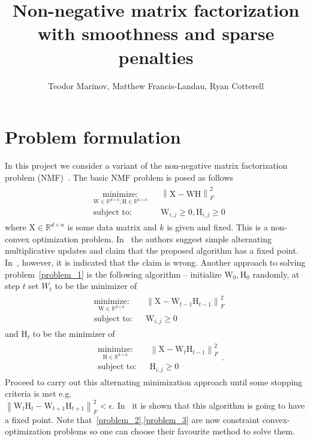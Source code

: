 \documentclass{article}
\newcommand{\0}{\mathrm{0}}
\newcommand{\1}{\mathrm{1}}
\renewcommand{\H}{\mathrm{H}}
\newcommand{\W}{\mathrm{W}}
\newcommand{\X}{\mathrm{X}}
\newcommand{\norm}[1]{\left\| #1 \right\|}
\newcommand{\minimize}[3]{
\begin{aligned}
& \underset{#1}{\textrm{minimize:}}
& & #2 \\
& \textrm{subject to:}
& &  #3
\end{aligned}
}
\begin{document}
\title{Non-negative matrix factorization with smoothness and sparse penalties}
\author{Teodor Marinov, Matthew Francis-Landau, Ryan Cotterell}
\date{}

\maketitle
\section{Problem formulation}
In this project we consider a variant of the non-negative matrix factorization problem (NMF)~\cite{lee2001algorithms}. The basic NMF problem is posed as follows
\begin{equation}\label{problem_1}
  \begin{aligned}
    \minimize{\W\in \mathbb{R}^{d\times k},\H \in \mathbb{R}^{k\times n}}{\norm{\X - \W\H}_F^2}{\W_{i,j} \geq 0,\H_{i,j}\geq 0}
  \end{aligned}
\end{equation}
where $\X\in\mathbb{R}^{d\times n}$ is some data matrix and $k$ is given and fixed. This is a non-convex optimization problem. In~\cite{lee2001algorithms} the authors suggest simple alternating multiplicative updates and claim that the proposed algorithm has a fixed point. In~\cite{gonzalez2005accelerating}, however, it is indicated that the claim is wrong. Another approach to solving problem~\ref{problem_1} is the following algorithm -- initialize $\W_0,\H_0$ randomly, at step $t$ set $W_{t}$ to be the minimizer of
\begin{equation}\label{problem_2}
  \begin{aligned}
    \minimize{\W\in \mathbb{R}^{d\times k}}{\norm{\X - \W_{t-1}\H_{t-1}}_F^2}{\W_{i,j} \geq 0}
  \end{aligned}
\end{equation}
and $\H_t$ to be the minimizer of
\begin{equation}\label{problem_3}
  \begin{aligned}
    \minimize{\H\in \mathbb{R}^{k\times n}}{\norm{\X - \W_{t}\H_{t-1}}_F^2}{\H_{i,j} \geq 0}.
  \end{aligned}
\end{equation}
Proceed to carry out this alternating minimization approach until some stopping criteria is met e.g.\\ $\norm{\W_t\H_t - \W_{t+1}\H_{t+1}}_F^2 < \epsilon$. In~\cite{tropp2003alternating} it is shown that this algorithm is going to have a fixed point. Note that~\ref{problem_2},\ref{problem_3} are now constraint convex-optimization problems so one can choose their favourite method to solve them.
\end{document}
